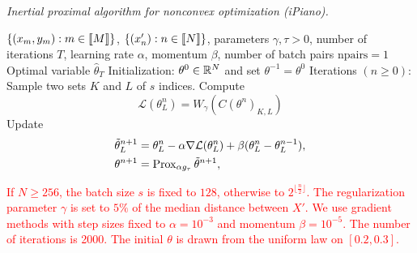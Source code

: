 \begin{algorithm}[th!]
  \caption{\textit{Inertial  proximal  algorithm  for  nonconvex  optimization
      (iPiano).}  }
  \label{algo:iPiano_pratice}
  \begin{algorithmic}
    \REQUIRE    $\{(x_{m},     y_{m})    :    m    \in     \llbracket    M    \rrbracket\}$,
    $\{(x'_{n}) : n \in \llbracket N \rrbracket\}$, parameters $\gamma, \tau > 0$, number of
    iterations $T$, learning rate $\alpha$, momentum $\beta$, number of batch pairs $ \textrm{npairs} = 1$ %
    \ENSURE    Optimal     variable    $\hat{\theta}_T$ %
    \STATE   Initialization:
    $\theta^0 \in \mathbb{R}^N$ and set $\theta^{-1} = \theta^{0}$ %
    \STATE          Iterations          $(n\geq          0)$:      Sample two sets $K$ and $L$ of $s$ indices.     
    Compute
    $$\mathcal{L} (\theta_{L}^n)         =       W_{\gamma}(C(\theta^n)_{K, L} )$$
    Update
    \begin{align*}
      \tilde{\theta}_{L}^{n+1} &= \theta_{L}^{n} -
      \alpha \nabla \mathcal{L} (\theta_{L}^n) + \beta (\theta_{L}^{n} - \theta_{L}^{n-1}),\\
            \theta^{n+1} &= \operatorname{Prox}_{\alpha g_{\tau}}  \tilde{\theta}^{n+1},
    \end{align*}    
  \end{algorithmic}
\end{algorithm}

  \textcolor{red}{If $N \geq 256$, the batch size $s$ is fixed to $128$, otherwise to $2^{\lfloor \tfrac{n}{2} \rfloor}$. The regularization parameter $\gamma $ is set to $5\%$ of the median distance between $X'$. We use gradient methods with step sizes fixed to $\alpha = 10^{-3}$ and momentum $\beta = 10^{-5}$. The number of iterations is 2000. The initial $\theta$ is drawn from the uniform law on $[0.2, 0.3]$.}  